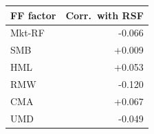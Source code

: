 \begin{tabular}{lr}
\toprule
FF factor & Corr.\ with RSF \\
\midrule
Mkt-RF & -0.066 \\
SMB & +0.009 \\
HML & +0.053 \\
RMW & -0.120 \\
CMA & +0.067 \\
UMD & -0.049 \\
\bottomrule
\end{tabular}